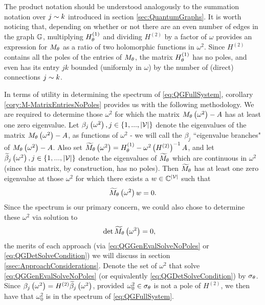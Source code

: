 The product notation should be understood analogously to the summation notation over $j\sim k$ introduced in section \ref{sec:QuantumGraphs}.
It is worth noticing that, depending on whether or not there are an even number of edges in the graph $\mathbb{G}$, multiplying $H^{(1)}_\theta$ and dividing $H^{(2)}$ by a factor of $\omega$ provides an expression for $M_\theta$ as a ratio of two holomorphic functions in $\omega^2$.
Since $H^{(2)}$ contains all the poles of the entries of $M_\theta$, the matrix $H^{(1)}_\theta$ has no poles, and even has its entry $jk$ bounded (uniformly in $\omega$) by the number of (direct) connections $j\sim k$.

In terms of utility in determining the spectrum of \eqref{eq:QGFullSystem}, corollary \ref{cory:M-MatrixEntriesNoPoles} provides us with the following methodology.
We are required to determine those $\omega^2$ for which the matrix $M_\theta\left( \omega^2 \right)-A$ has at least one zero eigenvalue.
Let $\beta_j\left( \omega^2 \right), j\in\left\{ 1,...,\left\lvert \mathcal{V} \right\rvert \right\}$ denote the eigenvalues of the matrix $M_\theta\left( \omega^2 \right)-A$, as functions of $\omega^2$ - we will call the $\beta_j$ ``eigenvalue branches" of $M_\theta\left( \omega^2 \right)-A$.
Also set $\widetilde{M}_\theta\left( \omega^2 \right) = H^{(1)}_\theta - \omega^2 \left( H^{(2)} \right)^{-1} A$, and let $\widetilde{\beta}_j\left( \omega^2 \right), j\in\left\{ 1,...,\left\lvert \mathcal{V} \right\rvert \right\}$ denote the eigenvalues of $\widetilde{M}_\theta$ which are continuous in $\omega^2$ (since this matrix, by construction, has no poles).
Then $\widetilde{M}_\theta$ has at least one zero eigenvalue at those $\omega^2$ for which there exists a $w\in\mathbb{C}^{\left\lvert \mathcal{V} \right\rvert}$ such that
\begin{align} \label{eq:QGGenEvalSolveNoPoles}
	\widetilde{M}_\theta\left( \omega^2 \right)w = 0.
\end{align}
Since the spectrum is our primary concern, we could also chose to determine these $\omega^2$ via solution to 
\begin{align} \label{eq:QGDetSolveCondition}
	\det\widetilde{M}_\theta\left( \omega^2 \right) &= 0,
\end{align}
the merits of each approach (via \eqref{eq:QGGenEvalSolveNoPoles} or \eqref{eq:QGDetSolveCondition}) we will discuss in section \ref{ssec:ApproachConsiderations}.
Denote the set of $\omega^2$ that solve \eqref{eq:QGGenEvalSolveNoPoles} (or equivalently \eqref{eq:QGDetSolveCondition}) by $\sigma_\theta$.
Since $\beta_j\left( \omega^2 \right) = H^{(2)}\widetilde{\beta}_j\left( \omega^2 \right)$, provided $\omega_0^2\in\sigma_\theta$ is not a pole of $H^{(2)}$, we then have that $\omega_0^2$ is in the spectrum of \eqref{eq:QGFullSystem}.
